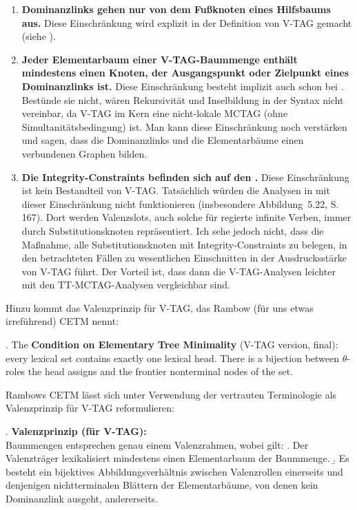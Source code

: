 \begin{enumerate}
  \item {\bf Dominanzlinks gehen nur von dem Fu\ss knoten eines Hilfsbaums aus.} Diese Einschränkung wird explizit in der Definition von V-TAG gemacht (siehe \citealt[Def.~21]{Rambow:94}).
  \item  {\bf Jeder Elementarbaum einer V-TAG-Baummenge enthält mindestens einen Knoten, der Ausgangspunkt oder Zielpunkt eines Dominanzlinks ist.} Diese Einschränkung besteht implizit auch schon bei \cite{Rambow:94}. Bestünde sie nicht, wären  Rekursivität und Inselbildung in der Syntax nicht vereinbar, da V-TAG im Kern eine nicht-lokale MCTAG (ohne Simultanitätsbedingung) ist. Man kann diese Einschränkung noch verstärken und sagen, dass die Dominanzlinks und die Elementarbäume einen verbundenen Graphen bilden.  
  \item {\bf Die Integrity-Constraints befinden sich auf den .} Diese Einschränkung ist kein Bestandteil von V-TAG. Tatsächlich würden die Analysen in \cite{Rambow:94} mit dieser Einschränkung nicht funktionieren (insbesondere Abbildung~5.22, S.\,167). Dort werden Valenzslots, auch solche für regierte infinite Verben, immer durch Substitutionsknoten repräsentiert. Ich sehe jedoch nicht, dass die Maßnahme, alle Substitutionsknoten mit Integrity-Constraints zu belegen, in den betrachteten Fällen zu wesentlichen Einschnitten in der Ausdrucksstärke von V-TAG führt. Der Vorteil ist, dass dann die V-TAG-Analysen leichter mit den TT-MCTAG-Analysen vergleichbar sind. 
\end{enumerate}     
Hinzu kommt das Valenzprinzip für V-TAG, das Rambow (für uns etwas irreführend) CETM nennt:    

\ex. The {\bf Condition on Elementary Tree Minimality} (V-TAG version, final): every lexical set contains exactly one lexical head. There is a bijection between $\theta$-roles the head assigns and the frontier nonterminal nodes of the set. \hfill
\citep[149]{Rambow:94} \label{ex-vtag-cetm}

Rambows CETM lässt sich unter Verwendung der vertrauten Terminologie als Valenzprinzip für V-TAG reformulieren:

\ex. {\bf Valenzprinzip (für V-TAG):} \label{ex-vtag-valenz}\\
Baummengen entsprechen genau einem Valenzrahmen, wobei gilt:
\a. Der Valenzträger lexikalisiert mindestens einen Elementarbaum der Baummenge.
\b. Es besteht ein bijektives Abbildungsverhältnis zwischen Valenzrollen einerseits und denjenigen nichtterminalen Blättern der Elementarbäume, von denen kein Dominanzlink ausgeht, andererseits.


